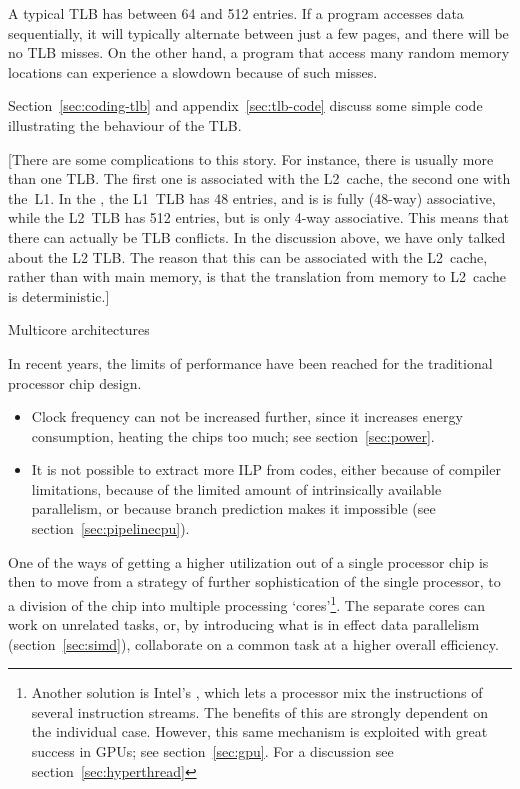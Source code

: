 A typical \ac{TLB} has between 64 and 512 entries. If a program accesses
data sequentially, it will typically alternate between just a few
pages, and there will be no \ac{TLB} misses. On the other hand, a program
that access many random memory locations can experience a slowdown
because of such misses. 

Section~\ref{sec:coding-tlb} and appendix~\ref{sec:tlb-code} discuss
some simple code illustrating the
behaviour of the \ac{TLB}.

[There are some complications to this story. For instance, there is
  usually more than one \ac{TLB}. The first one is associated with the
  L2~cache, the second one with the~L1. In the
  , the L1~\ac{TLB} has 48 entries, and
  is is fully (48-way) associative, while the L2~\ac{TLB} has 512
  entries, but is only 4-way associative. This means that there can
  actually be \ac{TLB} conflicts. In the discussion above, we have
  only talked about the L2 \ac{TLB}. The reason that this can be
  associated with the L2~cache, rather than with main memory, is that
  the translation from memory to L2~cache is deterministic.]

 {Multicore architectures}
\label{sec:multicore}

In recent years, the limits of performance have been reached for the
traditional processor chip design.
\begin{itemize}
\item Clock frequency can not be increased further, since it increases
  energy consumption, heating the chips too
  much; see section~\ref{sec:power}. 
\item It is not possible to extract more \acf{ILP}
  from codes, either because of compiler limitations, because of the
  limited amount of intrinsically available parallelism, or because
  branch prediction makes it impossible (see
  section~\ref{sec:pipelinecpu}).
\end{itemize}

One of the ways of getting a higher utilization out of a single
processor chip is then to move from a strategy of further
sophistication of the single processor, to a division of the chip into
multiple processing `cores'\footnote{Another solution is Intel's
  , which lets a processor mix the instructions of
  several instruction streams. The benefits of this are strongly
  dependent on the individual case. However, this same mechanism is
  exploited with great success in GPUs; see
  section~\ref{sec:gpu}. For a discussion see section~\ref{sec:hyperthread}}.
The separate cores can work on unrelated
tasks, or, by introducing what is in effect data parallelism
(section~\ref{sec:simd}), collaborate on a common task at a higher
overall efficiency.


